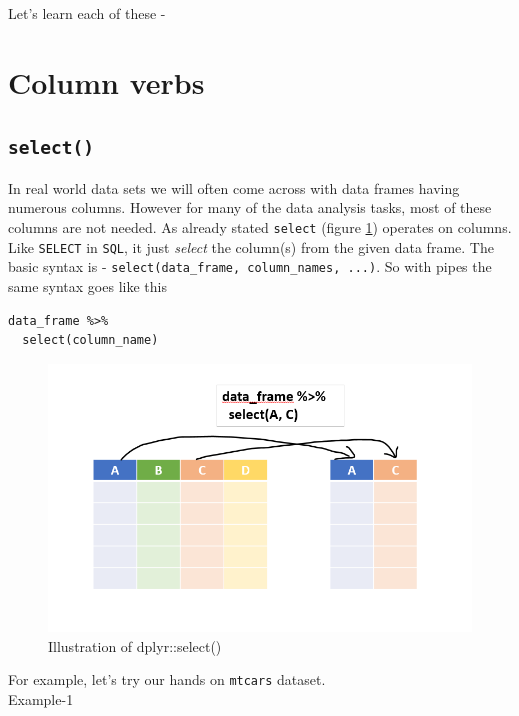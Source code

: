 \documentclass[
]{book}
\begin{document}
Let's learn each of these -

\hypertarget{column-verbs}{%
\section{Column verbs}\label{column-verbs}}

\hypertarget{select}{%
\subsection{\texorpdfstring{\texttt{select()}}{select()}}\label{select}}

In real world data sets we will often come across with data frames having numerous columns. However for many of the data analysis tasks, most of these columns are not needed. As already stated \texttt{select} (figure \ref{fig:selectr}) operates on columns. Like \texttt{SELECT} in \texttt{SQL}, it just \emph{select} the column(s) from the given data frame. The basic syntax is - \texttt{select(data\_frame,\ column\_names,\ ...)}. So with pipes the same syntax goes like this

\begin{verbatim}
data_frame %>% 
  select(column_name)
\end{verbatim}

\begin{figure}

{\centering \includegraphics[width=0.99\linewidth]{images/select_dplyr} 

}

\caption{Illustration of dplyr::select()}\label{fig:selectr}
\end{figure}

For example, let's try our hands on \texttt{mtcars} dataset.\\
Example-1
\end{document}
